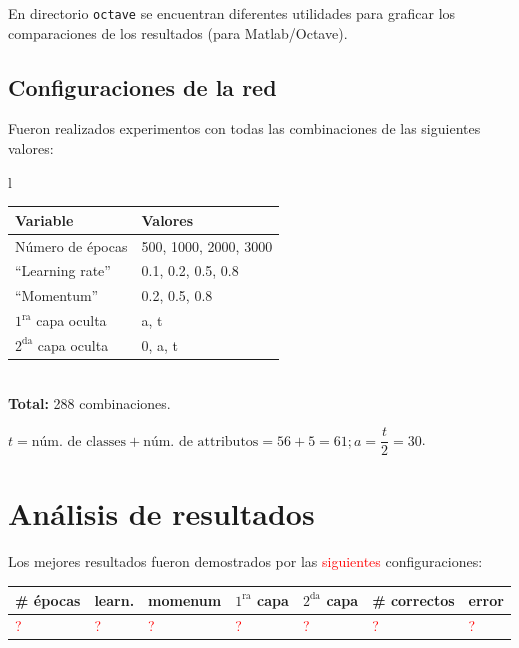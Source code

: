\documentclass{article}
\newcommand{\red}[1]	    {\textcolor{red}{#1}}
\begin{document}
\medskip
En directorio \verb|octave| se encuentran diferentes utilidades para graficar los comparaciones de los resultados (para Matlab/Octave).

\subsection{Configuraciones de la red}

Fueron realizados experimentos con todas las combinaciones de las siguientes valores:

\begin{center}
\begin{tabular}{l}
\begin{tabular}{|l|l|}
\hline
Variable 					& Valores				\\
\hline
Número de épocas			& 500, 1000, 2000, 3000 \\
``Learning rate''  	    	& 0.1, 0.2, 0.5, 0.8 	\\
``Momentum''				& 0.2, 0.5, 0.8 		\\
$1^{\text{ra}}$ capa oculta	& a, t					\\
$2^{\text{da}}$ capa oculta	& 0, a, t				\\
\hline
\end{tabular}\\
\textbf{Total:} 288 combinaciones.
\end{tabular}
\end{center}

$t=\text{núm. de classes} + \text{núm. de attributos} = 56+5=61; a=\dfrac{t}{2}=30$.



\section{Análisis de resultados}

Los mejores resultados fueron demostrados por las \red{siguientes} configuraciones:

\begin{center}
\begin{tabular}{|l|l|l|l|l|l|l|}
\hline
\# épocas & learn. & momenum & $1^{\text{ra}}$ capa & $2^{\text{da}}$ capa & \# correctos & error \\
\hline
\red{?} & \red{?} & \red{?} & \red{?} & \red{?} & \red{?} & \red{?} \\
\hline
\end{tabular}
\end{center}
\end{document}
